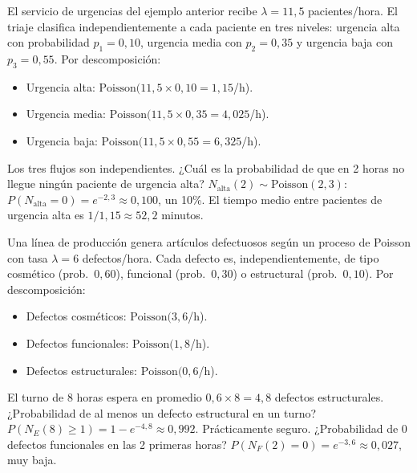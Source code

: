 \documentclass[11pt, letterpaper]{article}
\begin{document}
\begin{ejemplo}
El servicio de urgencias del ejemplo anterior recibe $\lambda = 11{,}5$ pacientes/hora. El triaje clasifica independientemente a cada paciente en tres niveles: urgencia alta con probabilidad $p_1 = 0{,}10$, urgencia media con $p_2 = 0{,}35$ y urgencia baja con $p_3 = 0{,}55$. Por descomposición:
\begin{itemize}[nosep]
    \item Urgencia alta: $\text{Poisson}(11{,}5 \times 0{,}10 = 1{,}15$/h).
    \item Urgencia media: $\text{Poisson}(11{,}5 \times 0{,}35 = 4{,}025$/h).
    \item Urgencia baja: $\text{Poisson}(11{,}5 \times 0{,}55 = 6{,}325$/h).
\end{itemize}
Los tres flujos son independientes. ¿Cuál es la probabilidad de que en 2 horas no llegue ningún paciente de urgencia alta? $N_{\text{alta}}(2) \sim \text{Poisson}(2{,}3)$: $P(N_{\text{alta}} = 0) = e^{-2{,}3} \approx 0{,}100$, un 10\%. El tiempo medio entre pacientes de urgencia alta es $1/1{,}15 \approx 52{,}2$ minutos.
\end{ejemplo}

\begin{ejemplo}
Una línea de producción genera artículos defectuosos según un proceso de Poisson con tasa $\lambda = 6$ defectos/hora. Cada defecto es, independientemente, de tipo cosmético (prob.\ $0{,}60$), funcional (prob.\ $0{,}30$) o estructural (prob.\ $0{,}10$). Por descomposición:
\begin{itemize}[nosep]
    \item Defectos cosméticos: $\text{Poisson}(3{,}6$/h).
    \item Defectos funcionales: $\text{Poisson}(1{,}8$/h).
    \item Defectos estructurales: $\text{Poisson}(0{,}6$/h).
\end{itemize}

El turno de 8 horas espera en promedio $0{,}6 \times 8 = 4{,}8$ defectos estructurales. ¿Probabilidad de al menos un defecto estructural en un turno? $P(N_E(8) \geq 1) = 1 - e^{-4{,}8} \approx 0{,}992$. Prácticamente seguro. ¿Probabilidad de 0 defectos funcionales en las 2 primeras horas? $P(N_F(2)=0) = e^{-3{,}6} \approx 0{,}027$, muy baja.
\end{ejemplo}
\end{document}
